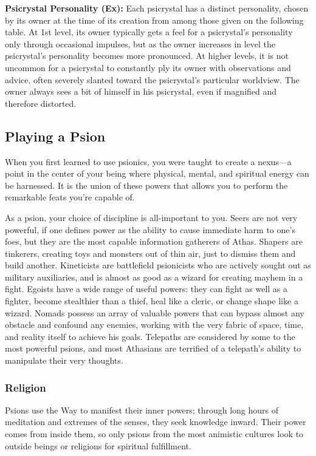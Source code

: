 \textbf{Psicrystal Personality (Ex):} Each psicrystal has a distinct personality, chosen by its owner at the time of its creation from among those given on the following table. At 1st level, its owner typically gets a feel for a psicrystal's personality only through occasional impulses, but as the owner increases in level the psicrystal's personality becomes more pronounced. At higher levels, it is not uncommon for a psicrystal to constantly ply its owner with observations and advice, often severely slanted toward the psicrystal's particular worldview. The owner always sees a bit of himself in his psicrystal, even if magnified and therefore distorted.

\subsection{Playing a Psion}
When you first learned to use psionics, you were taught to create a nexus---a point in the center of your being where physical, mental, and spiritual energy can be harnessed. It is the union of these powers that allows you to perform the remarkable feats you're capable of.

As a psion, your choice of discipline is all-important to you. Seers are not very powerful, if one defines power as the ability to cause immediate harm to one's foes, but they are the most capable information gatherers of Athas. Shapers are tinkerers, creating toys and monsters out of thin air, just to dismiss them and build another. Kineticists are battlefield psionicists who are actively sought out as military auxiliaries, and is almost as good as a wizard for creating mayhem in a fight. Egoists have a wide range of useful powers: they can fight as well as a fighter, become stealthier than a thief, heal like a cleric, or change shape like a wizard. Nomads possess an array of valuable powers that can bypass almost any obstacle and confound any enemies, working with the very fabric of space, time, and reality itself to achieve his goals. Telepaths are considered by some to the most powerful psions, and most Athasians are terrified of a telepath's ability to manipulate their very thoughts.

\subsubsection{Religion}
Psions use the Way to manifest their inner powers; through long hours of meditation and extremes of the senses, they seek knowledge inward. Their power comes from inside them, so only psions from the most animistic cultures look to outside beings or religions for spiritual fulfillment.

